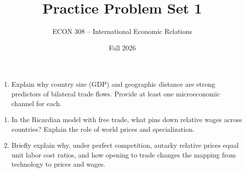 \documentclass[11pt]{article}
\title{Practice Problem Set 1}
\author{ECON 308 -- International Economic Relations}
\date{Fall 2026}
\begin{document}
\maketitle



\begin{enumerate}[leftmargin=*]
\item Explain why country size (GDP) and geographic distance are strong predictors of bilateral trade flows. Provide at least one microeconomic channel for each.
\end{enumerate}


\begin{enumerate}[leftmargin=*, resume]
\item In the Ricardian model with free trade, what pins down relative wages across countries? Explain the role of world prices and specialization.
\item Briefly explain why, under perfect competition, autarky relative prices equal unit labor cost ratios, and how opening to trade changes the mapping from technology to prices and wages.
\end{enumerate}
\bigskip
\end{document}
